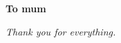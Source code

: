 \thispagestyle{plain}
\mbox{}
\vspace{60mm}
\begin{center}
    \textbf{To mum}
\end{center}
\begin{center}
    \textit{Thank you for everything.}
\end{center}
\newpage